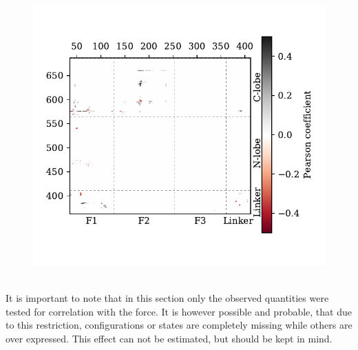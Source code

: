 \begin{figure}
	\centering
	\includegraphics[width=.7\textwidth]{figures/results/interface_corr}
	\label{force:contactmap}
\end{figure}
%
%
%
\\
It is important to note that in this section only the observed quantities were tested for correlation with the force. It is however possible and probable, that due to this restriction, configurations or states are completely missing while others are over expressed. This effect can not be estimated, but should be kept in mind.